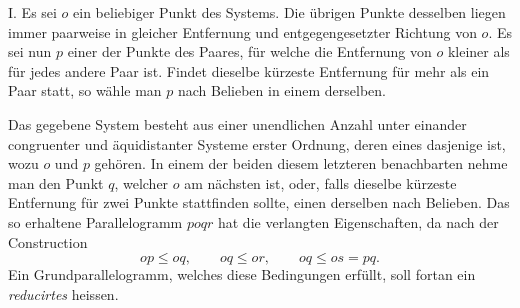 \documentclass[11pt]{article}
\begin{document}
I. Es sei $o$ ein beliebiger Punkt des Systems. Die übrigen Punkte desselben liegen immer paarweise in gleicher Entfernung und entgegengesetzter Richtung von $o$. Es sei nun $p$ einer der Punkte des Paares, für welche die Entfernung von $o$ kleiner als für jedes andere Paar ist. Findet dieselbe kürzeste Entfernung für mehr als ein Paar statt, so wähle man $p$ nach Belieben in einem derselben.

Das gegebene System besteht aus einer unendlichen Anzahl unter einander congruenter und äquidistanter Systeme erster Ordnung, deren eines dasjenige ist, wozu $o$ und $p$ gehören. In einem der beiden diesem letzteren benachbarten nehme man den Punkt $q$, welcher $o$ am nächsten ist, oder, falls dieselbe kürzeste Entfernung für zwei Punkte stattfinden sollte, einen derselben nach Belieben. Das so erhaltene Parallelogramm $poqr$ hat die verlangten Eigenschaften, da nach der Construction
\[
 op\le oq,\qquad oq\le or,
\qquad oq\le os=pq.
\]
Ein Grundparallelogramm, welches diese Bedingungen erfüllt, soll fortan ein \emph{reducirtes} heissen.

\begin{center}
\end{center}
\end{document}
